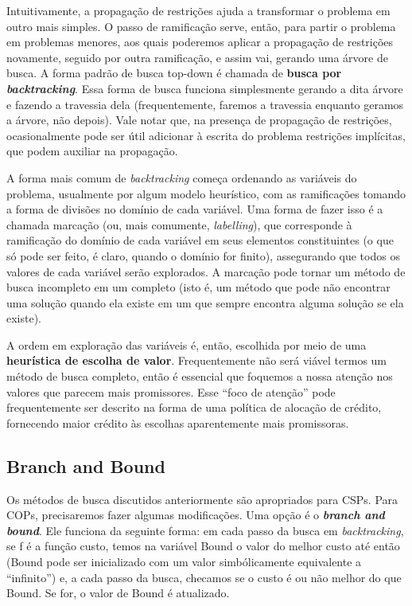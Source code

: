 \documentclass{article}
\theoremstyle{remark}
\theoremstyle{theorem}
\begin{document}
Intuitivamente, a propagação de restrições ajuda a transformar o problema em outro mais simples. O passo de ramificação serve, então, para partir o problema em problemas menores, aos quais poderemos aplicar a propagação de restrições novamente, seguido por outra ramificação, e assim vai, gerando uma árvore de busca. A forma padrão de busca top-down é chamada de \textbf{busca por \textit{backtracking}}. Essa forma de busca funciona simplesmente
gerando a dita árvore e fazendo a travessia dela (frequentemente, faremos a travessia enquanto geramos a árvore, não depois). Vale notar que, na presença de propagação de restrições, ocasionalmente pode ser útil adicionar à escrita do problema restrições implícitas, que podem auxiliar na propagação.

A forma mais comum de \textit{backtracking} começa ordenando as variáveis do problema, usualmente por algum modelo heurístico, com as ramificações tomando a forma de divisões no domínio de cada variável. Uma forma de fazer isso é a chamada marcação (ou, mais comumente, \textit{labelling}), que corresponde à ramificação do domínio de cada variável em seus elementos constituintes (o que só pode ser feito, é claro, quando o domínio for finito), assegurando que todos os valores de cada variável
serão explorados. A marcação pode tornar um método de busca incompleto em um completo (isto é, um método que pode não encontrar uma solução quando ela existe em um que sempre encontra alguma solução se ela existe).

A ordem em exploração das variáveis é, então, escolhida por meio de uma \textbf{heurística de escolha de valor}. Frequentemente não será viável termos um método de busca completo, então é essencial que foquemos a nossa atenção nos valores que parecem mais promissores. Esse ``foco de atenção'' pode frequentemente ser descrito na forma de uma política de alocação de crédito, fornecendo maior crédito às escolhas aparentemente mais promissoras.

\subsection{Branch and Bound}

Os métodos de busca discutidos anteriormente são apropriados para CSPs. Para COPs, precisaremos fazer algumas modificações. Uma opção é o \textit{\textbf{branch and bound}}. Ele funciona da seguinte forma: em cada passo da busca em \textit{backtracking}, se f é a função custo, temos na variável Bound o valor do melhor custo até então (Bound pode ser inicializado com um valor simbólicamente equivalente a ``infinito'') e, a cada passo da busca, checamos
se o custo é ou não melhor do que Bound. Se for, o valor de Bound é atualizado.
\end{document}
